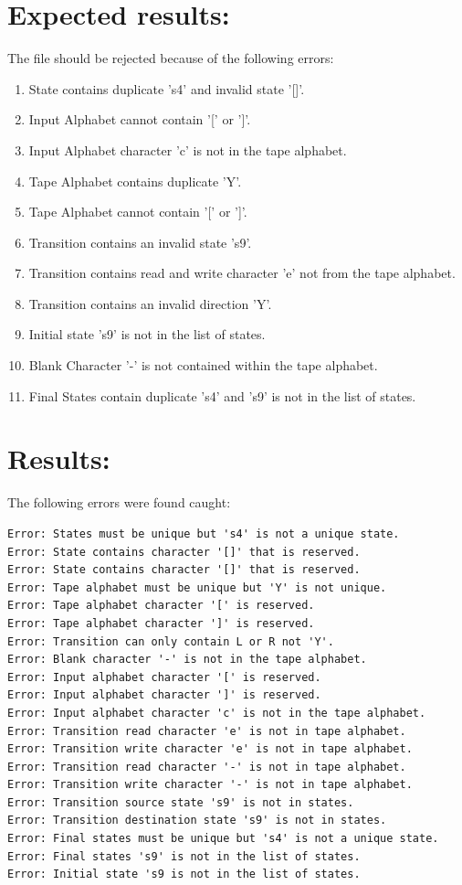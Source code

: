 \documentclass{report}
\begin{document}
\section{Expected results:} 
The file should be rejected because of the following errors:
\begin{enumerate}
\item State contains duplicate 's4' and invalid state '[]'.
\item Input Alphabet cannot contain '[' or ']'.
\item Input Alphabet character 'c' is not in the tape alphabet.

\item Tape Alphabet contains duplicate 'Y'.
\item Tape Alphabet cannot contain '[' or ']'.

\item Transition contains an invalid state 's9'.
\item Transition contains read and write character 'e' not from the tape alphabet.
\item Transition contains an invalid direction 'Y'.

\item Initial state 's9' is not in the list of states.

\item Blank Character '-' is not contained within the tape alphabet.

\item Final States contain duplicate 's4' and 's9' is not in the list of states.
\end{enumerate}

\section{Results:} 

The following errors were found caught:
\begin{verbatim}
Error: States must be unique but 's4' is not a unique state.
Error: State contains character '[]' that is reserved.
Error: State contains character '[]' that is reserved.
Error: Tape alphabet must be unique but 'Y' is not unique.
Error: Tape alphabet character '[' is reserved.
Error: Tape alphabet character ']' is reserved.
Error: Transition can only contain L or R not 'Y'.
Error: Blank character '-' is not in the tape alphabet.
Error: Input alphabet character '[' is reserved.
Error: Input alphabet character ']' is reserved.
Error: Input alphabet character 'c' is not in the tape alphabet.
Error: Transition read character 'e' is not in tape alphabet.
Error: Transition write character 'e' is not in tape alphabet.
Error: Transition read character '-' is not in tape alphabet.
Error: Transition write character '-' is not in tape alphabet.
Error: Transition source state 's9' is not in states.
Error: Transition destination state 's9' is not in states.
Error: Final states must be unique but 's4' is not a unique state.
Error: Final states 's9' is not in the list of states.
Error: Initial state 's9 is not in the list of states.
\end{verbatim}
\end{document}
